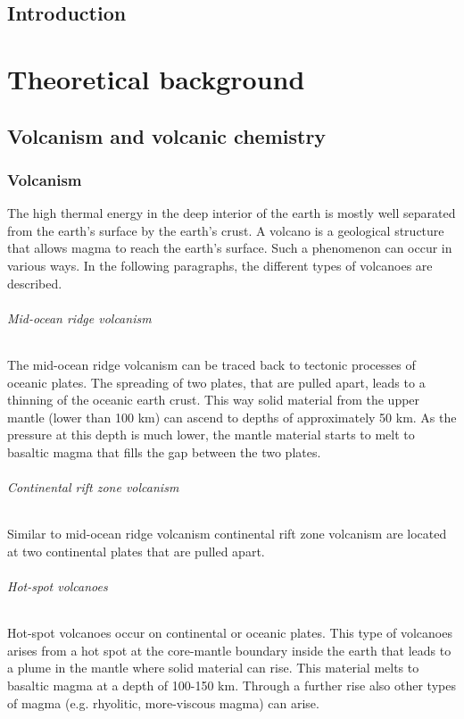 \documentclass  [
  paper    = a4,
  BCOR     = 10mm,
  twoside,
  fontsize = 12pt,
  fleqn,
  toc      = bibnumbered,
  toc      = listofnumbered,
  numbers  = noendperiod,
  headings = normal,
  listof   = leveldown,
  version  = 3.03
]                                       {scrreprt}
\begin{document}
  

  \tableofcontents
	\chapter{Introduction}	
	
    \part{Theoretical background}
\chapter{Volcanism and volcanic chemistry}
\section{Volcanism}
The high thermal energy in the deep interior of the earth is mostly well separated from the earth’s surface by the earth’s crust. A volcano is a geological structure that allows magma to reach the earth’s surface. Such a phenomenon can occur in various ways. In the following paragraphs, the different types of volcanoes are described.
\paragraph{ Mid-ocean ridge volcanism}
The mid-ocean ridge volcanism can be traced back to tectonic processes of oceanic plates. The spreading of two plates, that are pulled apart, leads to a thinning of the oceanic earth crust. This way solid material from the upper mantle (lower than 100 km) can ascend to depths of approximately 50 km. As the pressure at this depth is much lower, the mantle material starts to melt to basaltic magma that fills the gap between the two plates.
\paragraph{ Continental rift zone volcanism}
Similar to mid-ocean ridge volcanism continental rift zone volcanism are located at two continental plates that are pulled apart.
\paragraph{ Hot-spot volcanoes} Hot-spot volcanoes occur on continental or oceanic plates. This type of volcanoes arises from a hot spot at the core-mantle boundary inside the earth that leads to a plume in the mantle where solid material can rise. This material melts to basaltic magma at a depth of 100-150 km. Through a further rise also other types of magma (e.g. rhyolitic, more-viscous magma) can arise.
\end{document}
